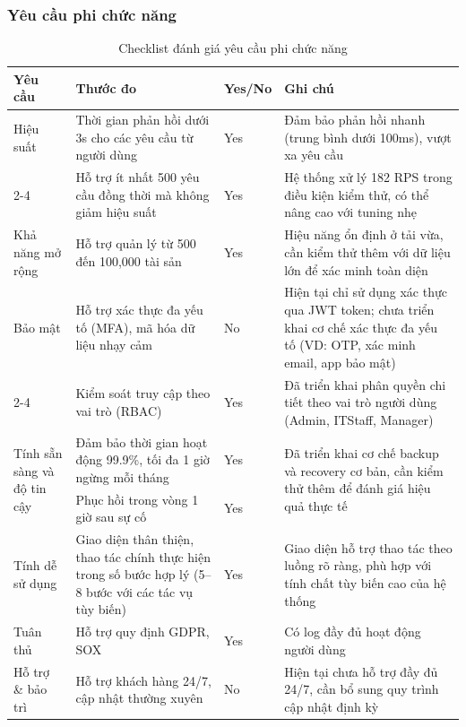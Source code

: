 \subsubsection{Yêu cầu phi chức năng}
\begin{table}[H]
\centering
\caption{Checklist đánh giá yêu cầu phi chức năng}
\begin{tabular}{|p{3cm}|p{5cm}|p{1.3cm}|p{5cm}|}
\hline
\textbf{Yêu cầu} & \textbf{Thước đo} & \textbf{Yes/No} & \textbf{Ghi chú} \\
\hline
Hiệu suất & Thời gian phản hồi dưới 3s cho các yêu cầu từ người dùng & Yes & Đảm bảo phản hồi nhanh (trung bình dưới 100ms), vượt xa yêu cầu \\
\cline{2-4}
& Hỗ trợ ít nhất 500 yêu cầu đồng thời mà không giảm hiệu suất & Yes & Hệ thống xử lý 182 RPS trong điều kiện kiểm thử, có thể nâng cao với tuning nhẹ \\
\hline
Khả năng mở rộng & Hỗ trợ quản lý từ 500 đến 100,000 tài sản & Yes & Hiệu năng ổn định ở tải vừa, cần kiểm thử thêm với dữ liệu lớn để xác minh toàn diện \\
\hline
Bảo mật & Hỗ trợ xác thực đa yếu tố (MFA), mã hóa dữ liệu nhạy cảm & No & Hiện tại chỉ sử dụng xác thực qua JWT token; chưa triển khai cơ chế xác thực đa yếu tố (VD: OTP, xác minh email, app bảo mật) \\
\cline{2-4}
& Kiểm soát truy cập theo vai trò (RBAC) & Yes & Đã triển khai phân quyền chi tiết theo vai trò người dùng (Admin, ITStaff, Manager) \\
\hline
\multirow{2}{3cm}{Tính sẵn sàng và độ tin cậy} 
& Đảm bảo thời gian hoạt động 99.9\%, tối đa 1 giờ ngừng mỗi tháng & Yes & \multirow{2}{5cm}{Đã triển khai cơ chế backup và recovery cơ bản, cần kiểm thử thêm để đánh giá hiệu quả thực tế} \\
\cline{2-3}
& Phục hồi trong vòng 1 giờ sau sự cố & Yes & \\
\hline
Tính dễ sử dụng & Giao diện thân thiện, thao tác chính thực hiện trong số bước hợp lý (5–8 bước với các tác vụ tùy biến) & Yes & Giao diện hỗ trợ thao tác theo luồng rõ ràng, phù hợp với tính chất tùy biến cao của hệ thống \\
\hline
Tuân thủ & Hỗ trợ quy định GDPR, SOX & Yes & Có log đầy đủ hoạt động người dùng \\
\hline
Hỗ trợ \& bảo trì & Hỗ trợ khách hàng 24/7, cập nhật thường xuyên & No & Hiện tại chưa hỗ trợ đầy đủ 24/7, cần bổ sung quy trình cập nhật định kỳ \\
\hline
\end{tabular}

\end{table}


